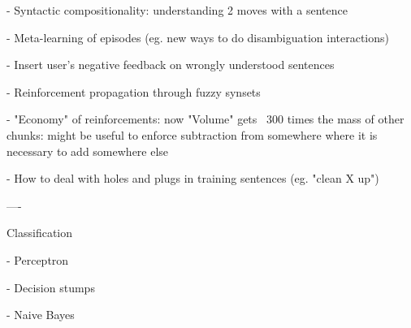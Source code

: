 - Syntactic compositionality: understanding 2 moves with a sentence
 
- Meta-learning of episodes (eg. new ways to do disambiguation interactions)
 
- Insert user's negative feedback on wrongly understood sentences
 
- Reinforcement propagation through fuzzy synsets
 
- "Economy" of reinforcements: now "Volume" gets ~300 times the mass of other
   chunks: might be useful to enforce subtraction from somewhere where it is
   necessary to add somewhere else 
   
- How to deal with holes and plugs in training sentences (eg. "clean X up")
 


----

Classification

- Perceptron
 
- Decision stumps
 
- Naive Bayes
